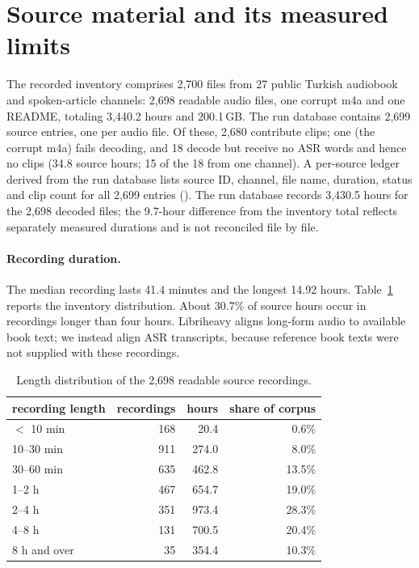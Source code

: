 \documentclass[11pt,a4paper]{article}
\begin{document}
\section{Source material and its measured limits}
\label{sec:corpus}
The recorded inventory comprises 2,700 files from 27 public Turkish audiobook
and spoken-article channels: 2,698 readable audio files, one corrupt m4a and
one README, totaling 3,440.2 hours and 200.1\,GB. The run database contains
2,699 source entries, one per audio file. Of these, 2,680 contribute clips;
one (the corrupt m4a) fails decoding, and 18 decode but receive no ASR words
and hence no clips (34.8 source hours; 15 of the 18 from one channel). A
per-source ledger derived from the run database lists source ID, channel,
file name, duration, status and clip count for all 2,699 entries
(). The run database records 3,430.5 hours for
the 2,698 decoded files; the 9.7-hour difference from the inventory total
reflects separately measured durations and is not reconciled file by file.

\paragraph{Recording duration.}
The median recording lasts 41.4 minutes and the longest 14.92 hours.
Table~\ref{tab:lengths} reports the inventory distribution. About 30.7\% of
source hours occur in recordings longer than four hours. Libriheavy aligns
long-form audio to available book text; we instead align ASR transcripts,
because reference book texts were not supplied with these recordings.

\begin{table}[t]
\centering
\small
\begin{tabular}{lrrr}
\toprule
recording length & recordings & hours & share of corpus \\
\midrule
$<$ 10 min   & 168 & 20.4 & 0.6\% \\
10--30 min   & 911 & 274.0 & 8.0\% \\
30--60 min   & 635 & 462.8 & 13.5\% \\
1--2 h       & 467 & 654.7 & 19.0\% \\
2--4 h       & 351 & 973.4 & 28.3\% \\
4--8 h       & 131 & 700.5 & 20.4\% \\
8 h and over & 35  & 354.4 & 10.3\% \\
\bottomrule
\end{tabular}
\caption{Length distribution of the 2,698 readable source recordings.}
\label{tab:lengths}
\end{table}
\end{document}
